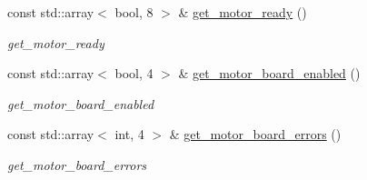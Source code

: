 \begin{DoxyCompactItemize}
const std\+::array$<$ bool, 8 $>$ \& \hyperlink{classblmc__robots_1_1Solo8TI_ae0572a7d9b2ec2b4c63188d0957c5b6f}{get\+\_\+motor\+\_\+ready} ()
\begin{DoxyCompactList}\small\item\em get\+\_\+motor\+\_\+ready \end{DoxyCompactList}\item 
const std\+::array$<$ bool, 4 $>$ \& \hyperlink{classblmc__robots_1_1Solo8TI_a1c99bf64212b2b5c84f7ccfbdea5b935}{get\+\_\+motor\+\_\+board\+\_\+enabled} ()
\begin{DoxyCompactList}\small\item\em get\+\_\+motor\+\_\+board\+\_\+enabled \end{DoxyCompactList}\item 
const std\+::array$<$ int, 4 $>$ \& \hyperlink{classblmc__robots_1_1Solo8TI_aa7d82d290e330c86af2f21d16098c460}{get\+\_\+motor\+\_\+board\+\_\+errors} ()
\begin{DoxyCompactList}\small\item\em get\+\_\+motor\+\_\+board\+\_\+errors \end{DoxyCompactList}\end{DoxyCompactItemize}
